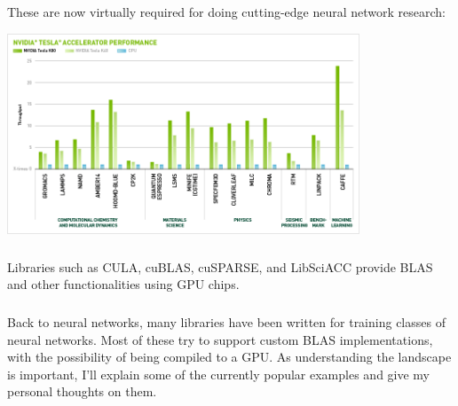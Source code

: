 \documentclass[xetex,mathserif,serif,aspectratio=169]{beamer}
\begin{document}
\begin{frame}[fragile] \frametitle{} \oldB \small

\textbf{}

These are now virtually required for doing cutting-edge neural network
research:

\begin{center}
\includegraphics[height=6cm]{img/tesla.png}
\end{center}

\end{frame}

\begin{frame}[fragile] \frametitle{} \oldB \small

\textbf{}

Libraries such as CULA, cuBLAS, cuSPARSE, and LibSciACC provide BLAS
and other functionalities using GPU chips.

\end{frame}

\begin{frame}[fragile] \frametitle{} \oldB \small

\textbf{}

Back to neural networks, many libraries have been written for training
classes of neural networks. Most of these try to support custom BLAS
implementations, with the possibility of being compiled to a GPU. As
understanding the landscape is important, I'll explain some of the
currently popular examples and give my personal thoughts on them.

\end{frame}
\end{document}

